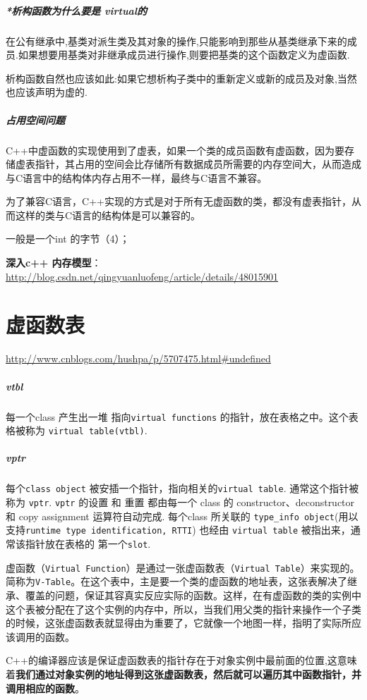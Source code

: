 \documentclass[UTF8,a4paper,12pt]{ctexbook} %
\begin{document}
		\subparagraph{*析构函数为什么要是 virtual的}在公有继承中,基类对派生类及其对象的操作,只能影响到那些从基类继承下来的成员.如果想要用基类对非继承成员进行操作,则要把基类的这个函数定义为虚函数.
			
			析构函数自然也应该如此:如果它想析构子类中的重新定义或新的成员及对象,当然也应该声明为虚的.
			
		\subparagraph{占用空间问题}C++中虚函数的实现使用到了虚表，如果一个类的成员函数有虚函数，因为要存储虚表指针，其占用的空间会比存储所有数据成员所需要的内存空间大，从而造成与C语言中的结构体内存占用不一样，最终与C语言不兼容。
		
		为了兼容C语言，C++实现的方式是对于所有无虚函数的类，都没有虚表指针，从而这样的类与C语言的结构体是可以兼容的。
		
		一般是一个int 的字节（4）； 
		
		\textbf{深入c++ 内存模型}：\url{http://blog.csdn.net/qingyuanluofeng/article/details/48015901}

	\section{虚函数表}
		\url{http://www.cnblogs.com/hushpa/p/5707475.html#undefined}
		
		\subparagraph{vtbl}
			每一个class 产生出一堆 指向\verb|virtual functions| 的指针，放在表格之中。这个表格被称为 \verb|virtual table(vtbl)|.
		\subparagraph{vptr}
			每个\verb|class object| 被安插一个指针，指向相关的\verb|virtual table|. 通常这个指针被称为 \verb|vptr|. \verb|vptr| 的设置 和 重置 都由每一个 class 的 constructor、deconstructor 和 copy assignment 运算符自动完成. 每个class 所关联的 \verb|type_info object|(用以 支持\verb|runtime type identification, RTTI|) 也经由 \verb|virtual table| 被指出来，通常该指针放在表格的 第一个\verb|slot|.
						
			虚函数（\verb|Virtual Function|）是通过一张虚函数表（\verb|Virtual Table|）来实现的。简称为\verb|V-Table|。在这个表中，主是要一个类的虚函数的地址表，这张表解决了继承、覆盖的问题，保证其容真实反应实际的函数。这样，在有虚函数的类的实例中这个表被分配在了这个实例的内存中，所以，当我们用父类的指针来操作一个子类的时候，这张虚函数表就显得由为重要了，它就像一个地图一样，指明了实际所应该调用的函数。	
			
			
	        C++的编译器应该是保证虚函数表的指针存在于对象实例中最前面的位置,这意味着\textbf{我们通过对象实例的地址得到这张虚函数表，然后就可以遍历其中函数指针，并调用相应的函数}。
	        
\end{document}
